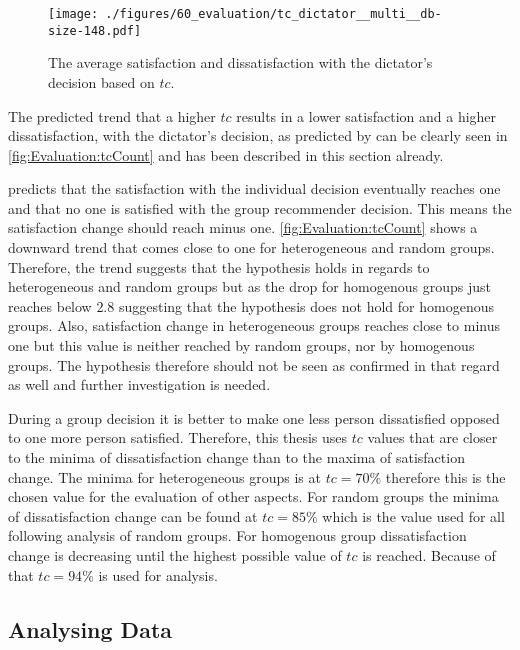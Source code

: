 \begin{figure}
    \centering
    \texttt{[image: ./figures/60\_evaluation/tc\_dictator\_\_multi\_\_db-size-148.pdf]}
    \caption{The average satisfaction and dissatisfaction with the dictator's decision based on $tc$.}
    \label{fig:Evaluation:tcCount}
\end{figure}

The predicted trend that a higher $tc$ results in a lower satisfaction and a higher dissatisfaction, with the dictator's decision, as predicted by  can be clearly seen in \autoref{fig:Evaluation:tcCount} and has been described in this section already.

 predicts that the satisfaction with the individual decision eventually reaches one and that no one is satisfied with the group recommender decision. This means the satisfaction change should reach minus one. \autoref{fig:Evaluation:tcCount} shows a downward trend that comes close to one for heterogeneous and random groups. Therefore, the trend suggests that the hypothesis holds in regards to heterogeneous and random groups but as the drop for homogenous groups just reaches below $2.8$ suggesting that the hypothesis does not hold for homogenous groups. Also, satisfaction change in heterogeneous groups reaches close to minus one but this value is neither reached by random groups, nor by homogenous groups. The hypothesis therefore should not be seen as confirmed in that regard as well and further investigation is needed.

During a group decision it is better to make one less person dissatisfied opposed to one more person satisfied. Therefore, this thesis uses $tc$ values that are closer to the minima of dissatisfaction change than to the maxima of satisfaction change. The minima for heterogeneous groups is at $tc = 70\%$ therefore this is the chosen value for the evaluation of other aspects. For random groups the minima of dissatisfaction change can be found at $tc = 85\%$ which is the value used for all following analysis of random groups. For homogenous group dissatisfaction change is decreasing until the highest possible value of $tc$ is reached. Because of that $tc = 94\%$ is used for analysis.

\subsection{Analysing Data}


